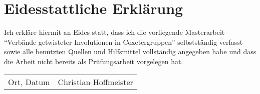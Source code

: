 \chapter*{Eidesstattliche Erklärung}

Ich erkläre hiermit an Eides statt, dass ich die vorliegende Masterarbeit ``Verbände getwisteter Involutionen in Coxetergruppen'' selbstständig verfasst sowie alle benutzten Quellen und Hilfsmittel vollständig angegeben habe und dass die Arbeit nicht bereits als Prüfungsarbeit vorgelegen hat. 

\vspace*{1.75cm}

\noindent \begin{tabularx}{\linewidth}{Xr}
\hline
{\footnotesize Ort, Datum} & {\footnotesize Christian Hoffmeister} \\
\end{tabularx}